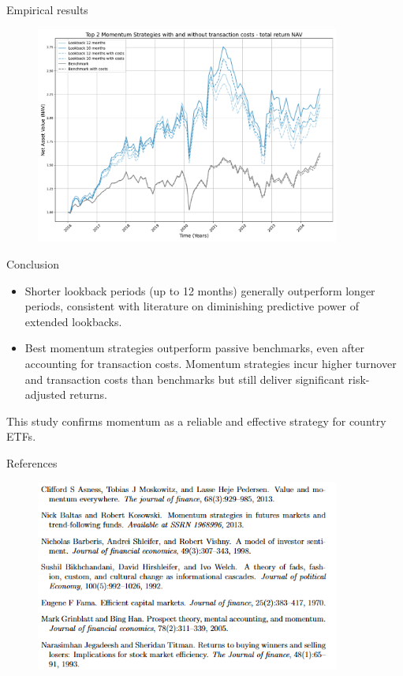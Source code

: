 \documentclass{beamer}
\begin{document}
\begin{frame}[t]{Empirical results}
    \begin{figure}[t!]\centering
    \includegraphics[width=10cm]{figures/fig_costs.pdf}
    \centering
    \label{fig_costs}
    \end{figure}
\end{frame}

\begin{frame}[t]{Conclusion}
    \begin{itemize}
        \item Shorter lookback periods (up to 12 months) generally outperform longer periods, consistent with literature on diminishing predictive power of extended lookbacks.
        \item Best momentum strategies outperform passive benchmarks, even after accounting for transaction costs. Momentum strategies incur higher turnover and transaction costs than benchmarks but still deliver significant risk-adjusted returns.
    \end{itemize}

    This study confirms momentum as a reliable and effective strategy for country ETFs.
\end{frame}


\begin{frame}[t]{References}
    \begin{figure}[t!]\centering
    \includegraphics[width=10cm]{figures/ref1.PNG}
    \centering
    \label{ref1}
    \end{figure}
    
\end{frame}
\end{document}
